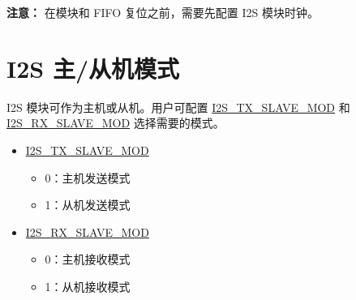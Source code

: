\documentclass[main\_\_CN.tex]{subfiles}
\begin{document}
{\bfseries 注意：}
在模块和 FIFO 复位之前，需要先配置 I2S 模块时钟。


\section{I2S 主/从机模式}

\chipname{} I2S 模块可作为主机或从机。用户可配置  \hyperref[fielddesc:I2STXSLAVEMOD]{I2S\_TX\_SLAVE\_MOD} 和 \hyperref[fielddesc:I2SRXSLAVEMOD]{I2S\_RX\_SLAVE\_MOD} 选择需要的模式。

\begin{itemize}
    \item \hyperref[fielddesc:I2STXSLAVEMOD]{I2S\_TX\_SLAVE\_MOD}
    \begin{itemize}
        \item 0：主机发送模式
        \item 1：从机发送模式
    \end{itemize}
    \item \hyperref[fielddesc:I2SRXSLAVEMOD]{I2S\_RX\_SLAVE\_MOD}
    \begin{itemize}
        \item 0：主机接收模式
        \item 1：从机接收模式
    \end{itemize}
\end{itemize}
\end{document}
